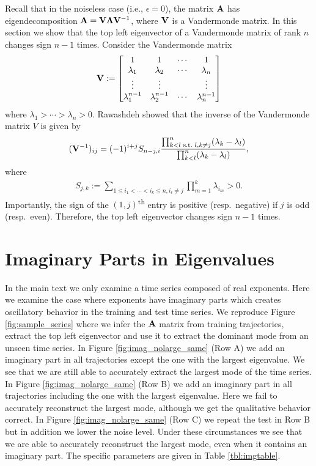 \documentclass[%
 reprint,
 amsmath,amssymb,
 aps,
]{revtex4-2}
\begin{document}
Recall that in the noiseless case (i.e., $\epsilon=0$), the matrix ${\bf A}$ has eigendecomposition ${\bf A}={\bf V}\boldsymbol{\Lambda}{\bf V}^{-1}$, where ${\bf V}$ is a Vandermonde matrix. In this section we show that the top left eigenvector of a Vandermonde matrix of rank $n$ changes sign $n-1$ times. Consider the Vandermonde matrix
\begin{align*}
    {\bf V}:=\begin{bmatrix}
        1 & 1 & \cdots & 1 \\
        \lambda_1 & \lambda_2 & \cdots &\lambda_n\\
        \vdots & \vdots & & \vdots\\
        \lambda_1^{n-1}&\lambda_2^{n-1}&\cdots&\lambda_n^{n-1}
    \end{bmatrix}
\end{align*}
where $\lambda_1>\cdots>\lambda_n>0$. Rawashdeh \citep{rawashdeh2019simple} showed that the inverse of the Vandermonde matrix $V$ is given by
\begin{align*}
    (\V^{-1})_{ij}=(-1)^{i+j}S_{n-j,i}\frac{\prod_{k<l\text{ s.t.\ }l,k\ne j}^n(\lambda_k-\lambda_l)}{\prod_{k<l}^n(\lambda_k-\lambda_l)},
\end{align*}
where
\begin{align*}
    S_{j,k}:=\sum_{1\le i_1<\cdots<i_k\le n,i_\ell\ne j}\prod_{m=1}^k\lambda_{i_m}>0.
\end{align*}
Importantly, the sign of the $(1,j)$\textsuperscript{th} entry is positive (resp.\ negative) if $j$ is odd (resp.\ even). Therefore, the top left eigenvector changes sign $n-1$ times.


\section{Imaginary Parts in Eigenvalues}
In the main text we only examine a time series composed of real exponents. Here we examine the case where exponents have imaginary parts which creates oscillatory behavior in the training and test time series. We reproduce Figure \ref{fig:sample_series} where we infer the ${\bf A}$ matrix from training trajectories, extract the top left eigenvector and use it to extract the dominant mode from an unseen time series. In Figure \ref{fig:imag_nolarge_same} (Row A) we add an imaginary part in all trajectories except the one with the largest eigenvalue. We see that we are still able to accurately extract the largest mode of the time series. In Figure \ref{fig:imag_nolarge_same} (Row B) we add an imaginary part in all trajectories including the one with the largest eigenvalue. Here we fail to accurately reconstruct the largest mode, although we get the qualitative behavior correct. In Figure \ref{fig:imag_nolarge_same} (Row C) we repeat the test in Row B but in addition we lower the noise level. Under these circumstances we see that we are able to accurately reconstruct the largest mode, even when it contains an imaginary part. The specific parameters are given in Table \ref{tbl:imgtable}.
\end{document}
